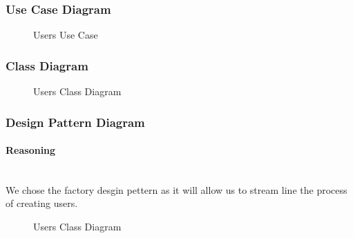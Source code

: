 \subsubsection{Use Case Diagram}
	\begin{figure}[h!]
	\caption{Users Use Case}
	\end{figure}
	
\subsubsection{Class Diagram}
	\begin{figure}[h!]
	\caption{Users Class Diagram}
	\end{figure}

\subsubsection{Design Pattern Diagram}
	\paragraph{Reasoning}
	\mbox{}\\
	We chose the factory desgin pettern as it will allow us to stream line the process of creating users. 
	\begin{figure}[h!]
	\caption{Users Class Diagram}
	\end{figure}
